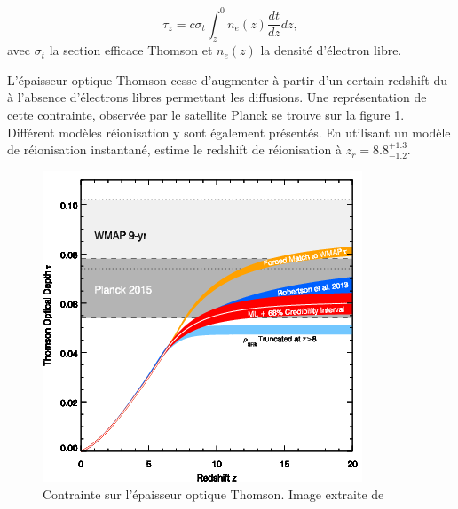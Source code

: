 \begin{equation}
\tau_z = c \sigma_t \int_z^0 n_e (z) \frac{dt}{dz} dz,
\end{equation}
avec $\sigma_t$ la section efficace Thomson et $n_e (z)$ la densité d'électron libre.

L'épaisseur optique Thomson cesse d'augmenter à partir d'un certain redshift du à l’absence d'électrons libres permettant les diffusions.
Une représentation de cette contrainte, observée par le satellite Planck se trouve sur la figure \ref{fig:epaisseur_optique_thomson}.
Différent modèles réionisation y sont également présentés.
En utilisant un modèle de réionisation instantané, \cite{planck_collaboration_planck_2016} estime le redshift de réionisation à $z_r = 8.8 ^{+1.3}_{-1.2}$.

\begin{figure}
        \includegraphics[width=.9\linewidth]{img/01/epaisseur_optique_thomson.png} 
        \caption[Epaisseur optique Thomson]{%
		Contrainte sur l'épaisseur optique Thomson.
        Image extraite de \cite{2015ApJ...802L..19R}
 		\label{fig:epaisseur_optique_thomson} }
\end{figure}

%


